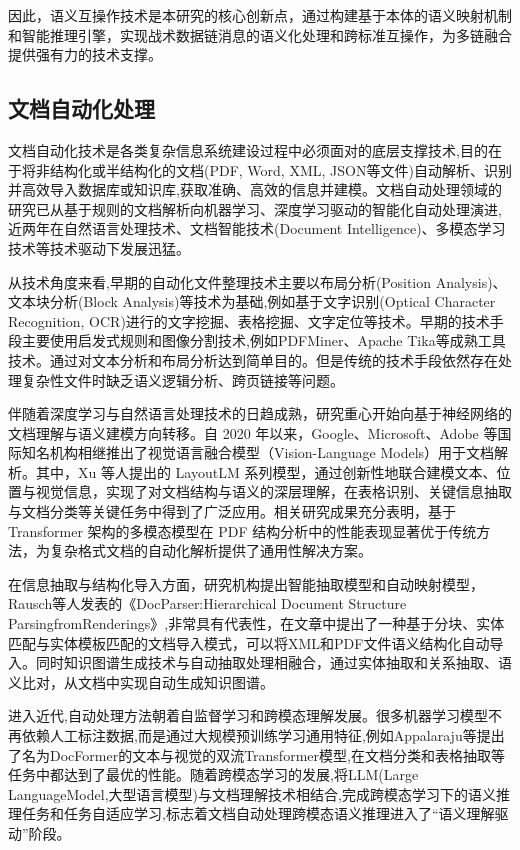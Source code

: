 因此，语义互操作技术是本研究的核心创新点，通过构建基于本体的语义映射机制和智能推理引擎，实现战术数据链消息的语义化处理和跨标准互操作，为多链融合提供强有力的技术支撑。


\subsection{文档自动化处理}

文档自动化技术是各类复杂信息系统建设过程中必须面对的底层支撑技术,目的在于将非结构化或半结构化的文档(PDF, Word, XML, JSON等文件)自动解析、识别并高效导入数据库或知识库,获取准确、高效的信息并建模。文档自动处理领域的研究已从基于规则的文档解析向机器学习、深度学习驱动的智能化自动处理演进,近两年在自然语言处理技术、文档智能技术(Document Intelligence)、多模态学习技术等技术驱动下发展迅猛。

从技术角度来看,早期的自动化文件整理技术主要以布局分析(Position Analysis)、文本块分析(Block Analysis)等技术为基础,例如基于文字识别(Optical Character Recognition, OCR)进行的文字挖掘、表格挖掘、文字定位等技术。早期的技术手段主要使用启发式规则和图像分割技术,例如PDFMiner、Apache Tika等成熟工具技术。通过对文本分析和布局分析达到简单目的。但是传统的技术手段依然存在处理复杂性文件时缺乏语义逻辑分析、跨页链接等问题。

伴随着深度学习与自然语言处理技术的日趋成熟，研究重心开始向基于神经网络的文档理解与语义建模方向转移。自 2020 年以来，Google、Microsoft、Adobe 等国际知名机构相继推出了视觉语言融合模型（Vision-Language Models）用于文档解析。其中，Xu 等人提出的 LayoutLM 系列模型\cite{Xu2020LayoutLM,Huang2022LayoutLMv3}，通过创新性地联合建模文本、位置与视觉信息，实现了对文档结构与语义的深层理解，在表格识别、关键信息抽取与文档分类等关键任务中得到了广泛应用。相关研究成果充分表明，基于 Transformer 架构的多模态模型在 PDF 结构分析中的性能表现显著优于传统方法，为复杂格式文档的自动化解析提供了通用性解决方案。

在信息抽取与结构化导入方面，研究机构提出智能抽取模型和自动映射模型，Rausch等人发表的《DocParser:Hierarchical Document Structure ParsingfromRenderings》\cite{Rausch2021DocParser},非常具有代表性，在文章中提出了一种基于分块、实体匹配与实体模板匹配的文档导入模式，可以将XML和PDF文件语义结构化自动导入。同时知识图谱生成技术与自动抽取处理相融合，通过实体抽取和关系抽取、语义比对，从文档中实现自动生成知识图谱。

进入近代,自动处理方法朝着自监督学习和跨模态理解发展。很多机器学习模型不再依赖人工标注数据,而是通过大规模预训练学习通用特征,例如Appalaraju等提出了名为DocFormer的文本与视觉的双流Transformer模型\cite{Appalaraju2021DocFormer},在文档分类和表格抽取等任务中都达到了最优的性能。随着跨模态学习的发展,将LLM(Large LanguageModel,大型语言模型)与文档理解技术相结合,完成跨模态学习下的语义推理任务和任务自适应学习\cite{Wang2023DocumentLLM},标志着文档自动处理跨模态语义推理进入了“语义理解驱动”阶段。

